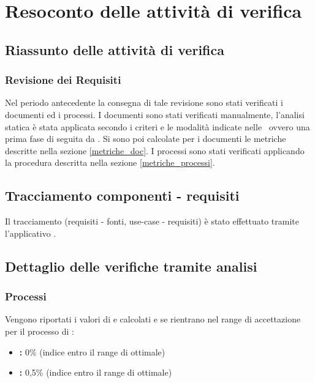 \documentclass[12pt,a4paper]{article}
\begin{document}
\section{Resoconto delle attività di verifica} \label{Resoconto delle attività di verifica}
\subsection{Riassunto delle attività di verifica} 
\subsubsection{Revisione dei Requisiti}
Nel periodo antecedente la consegna di tale revisione sono stati verificati i documenti ed i processi.
I documenti sono stati verificati manualmente, l'analisi statica è stata applicata secondo i criteri e le modalità indicate nelle \NdP\, ovvero una prima fase di  seguita da .
Si sono poi calcolate per i documenti le metriche descritte nella sezione \ref{metriche_doc}.
I processi sono stati verificati applicando la procedura descritta nella sezione \ref{metriche_processi}.

\subsection{Tracciamento componenti - requisiti}
Il tracciamento (requisiti - fonti, use-case - requisiti) è stato effettuato tramite l'applicativo .

\subsection{Dettaglio delle verifiche tramite analisi}
\subsubsection{Processi}
Vengono riportati i valori di  e  calcolati e se rientrano nel range di accettazione per il processo di \FA:
\begin{itemize}
	\item \textbf{:} 0\% (indice entro il range di ottimale)
	\item \textbf{:} 0,5\% (indice entro il range di ottimale)
\end{itemize}
\end{document}
